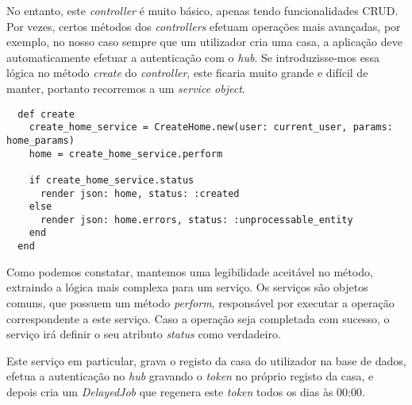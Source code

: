No entanto, este \textit{controller} é muito básico, apenas tendo funcionalidades CRUD. Por vezes, certos métodos dos \textit{controllers} efetuam operações mais avançadas, por exemplo, no nosso caso sempre que um utilizador cria uma casa, a aplicação deve automaticamente efetuar a autenticação com o \textit{hub}. Se introduzisse-mos essa lógica no método \textit{create} do \textit{controller}, este ficaria muito grande e difícil de manter, portanto recorremos a um \textit{service object}.

\begin{verbatim}
  def create
    create_home_service = CreateHome.new(user: current_user, params: home_params)
    home = create_home_service.perform

    if create_home_service.status
      render json: home, status: :created
    else
      render json: home.errors, status: :unprocessable_entity
    end
  end
\end{verbatim}

Como podemos constatar, mantemos uma legibilidade aceitável no método, extraindo a lógica mais complexa para um serviço. Os serviços são objetos comuns, que possuem um método \textit{perform}, responsável por executar a operação correspondente a este serviço. Caso a operação seja completada com sucesso, o serviço irá definir o seu atributo \textit{status} como verdadeiro.

Este serviço em particular, grava o registo da casa do utilizador na base de dados, efetua a autenticação no \textit{hub} gravando o \textit{token} no próprio registo da casa, e depois cria um \textit{DelayedJob} que regenera este \textit{token} todos os dias às 00:00.


